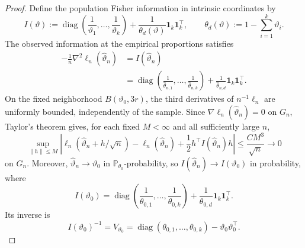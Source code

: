 \documentclass[10pt,a4paper]{amsart}
\theoremstyle{named}
\theoremstyle{named1}
\theoremstyle{plain}
\theoremstyle{remark}
\begin{document}
\begin{proof}
Define the population Fisher information in intrinsic coordinates by
\[
    I(\vartheta)
    :=
    \operatorname{diag}\left(
        \frac1{\vartheta_1},\ldots,\frac1{\vartheta_k}
    \right)
    +\frac1{\theta_d(\vartheta)}\mathbf1_k\mathbf1_k^\top,
    \qquad
    \theta_d(\vartheta):=1-\sum_{i=1}^k\vartheta_i.
\]
The observed information at the empirical proportions satisfies
\begin{equation}
\begin{aligned}
    -\frac1n\nabla^2\ell_n(\widehat\vartheta_n)
    &=I(\widehat\vartheta_n)\\
    &=
    \operatorname{diag}\left(
        \frac1{\widehat\theta_{n,1}},\ldots,
        \frac1{\widehat\theta_{n,k}}
    \right)
    +\frac1{\widehat\theta_{n,d}}\mathbf1_k\mathbf1_k^\top.
\end{aligned}
    \label{eq:empirical-information}
\end{equation}
On the fixed neighborhood $B(\vartheta_0,3r)$, the third derivatives of
$n^{-1}\ell_n$ are uniformly bounded, independently of the sample.
Since $\nabla\ell_n(\widehat\vartheta_n)=0$ on $G_n$, Taylor's theorem
gives, for each fixed $M<\infty$ and all sufficiently large $n$,
\begin{equation}
    \sup_{\|h\|\leq M}
    \left|
        \ell_n(\widehat\vartheta_n+h/\sqrt n)
        -\ell_n(\widehat\vartheta_n)
        +\frac12h^\top I(\widehat\vartheta_n)h
    \right|
    \leq\frac{CM^3}{\sqrt n}
    \rightarrow0
    \label{eq:local-likelihood-expansion}
\end{equation}
on $G_n$. Moreover, $\widehat\vartheta_n\to\vartheta_0$ in
$\mathbb P_{\theta_0}$-probability, so
$I(\widehat\vartheta_n)\to I(\vartheta_0)$ in probability, where
\begin{equation}
    I(\vartheta_0)
    =
    \operatorname{diag}\left(
        \frac1{\theta_{0,1}},\ldots,\frac1{\theta_{0,k}}
    \right)
    +\frac1{\theta_{0,d}}\mathbf1_k\mathbf1_k^\top.
    \label{eq:fisher-information}
\end{equation}
Its inverse is
\begin{equation}
    I(\vartheta_0)^{-1}
    =V_{\vartheta_0}
    =\operatorname{diag}(\theta_{0,1},\ldots,\theta_{0,k})
     -\vartheta_0\vartheta_0^\top.
    \label{eq:inverse-information}
\end{equation}


\end{proof}
\end{document}
